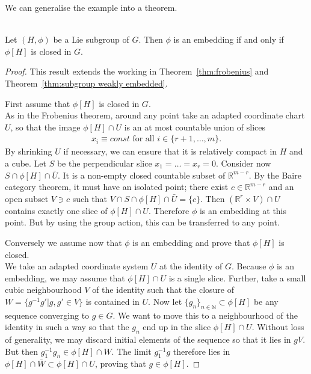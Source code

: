 We can generalise the example into a theorem.

\begin{theorem}
\textup{\cite[3.21]{Warner1983}}\\
Let $(H,\phi)$ be a Lie subgroup of $G$. Then $\phi$ is an embedding if and only if $\phi[H]$ is closed in $G$.
\end{theorem}
\begin{proof}
This result extends the working in Theorem~\ref{thm:frobenius} and Theorem~\ref{thm:subgroup weakly embedded}.

First assume that $\phi[H]$ is closed in $G$.\\
As in the Frobenius theorem, around any point take an adapted coordinate chart $U$, so that the image $\phi[H]\cap U$ is an at most countable union of slices 
\begin{align*}
x_i \equiv const \text{ for all } i \in \{r+1,\dots,m\}.
\end{align*} 
By shrinking $U$ if necessary, we can ensure that it is relatively compact in $H$ and a cube.
Let $S$ be the perpendicular slice $x_1 = \dots = x_r = 0$.
Consider now $S \cap \phi[H] \cap \bar{U}$.
It is a non-empty closed countable subset of $\mathbb{R}^{m-r}$.
By the Baire category theorem, it must have an isolated point; there exist $c \in \mathbb{R}^{m-r}$ and an open subset $V \ni c$ such that $V \cap S \cap \phi[H] \cap \bar{U} = \{c\}$.
Then $(\mathbb{R}^r \times V) \cap U$ contains exactly one slice of $\phi[H]\cap U$.
Therefore $\phi$ is an embedding at this point.
But by using the group action, this can be transferred to any point.

Conversely we assume now that $\phi$ is an embedding and prove that $\phi[H]$ is closed. \\
We take an adapted coordinate system $U$ at the identity of $G$.
Because $\phi$ is an embedding, we may assume that $\phi[H] \cap U$ is a single slice.
Further, take a small cubic neighbourhood $V$ of the identity such that the closure of $W = \{g^{-1}g' | g,g' \in V \}$ is contained in $U$.
Now let $\{g_n\}_{n \in \mathbb{N}} \subset \phi[H]$ be any sequence converging to $g \in G$. 
We want to move this to a neighbourhood of the identity in such a way so that the $g_n$ end up in the slice $\phi[H] \cap U$.
Without loss of generality, we may discard initial elements of the sequence so that it lies in $gV$. 
But then $g_1^{-1}g_n \in \phi[H] \cap W$.
The limit $g_1^{-1}g$ therefore lies in $\phi[H] \cap \bar{W} \subset \phi[H] \cap U$, proving that $g \in \phi[H]$.
\end{proof}


